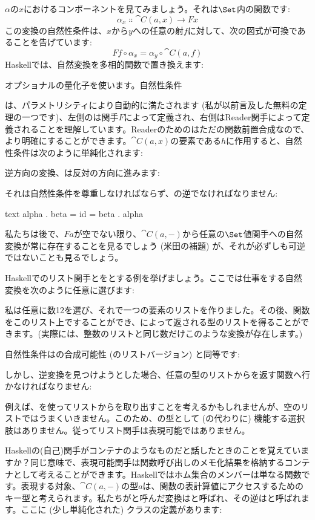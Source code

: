 $\alpha$の$x$におけるコンポーネントを見てみましょう。それは$\Set$内の関数です: 
\[\alpha_x \Colon \cat{C}(a, x) \to F x\]
この変換の自然性条件は、$x$から$y$への任意の射$f$に対して、次の図式が可換であることを告げています: 
\[F f \circ \alpha_x = \alpha_y \circ \cat{C}(a, f)\]
Haskellでは、自然変換を多相的関数で置き換えます: 

オプショナルの量化子を使います。自然性条件

は、パラメトリシティにより自動的に満たされます (私が以前言及した無料の定理の一つです)、左側のは関手$F$によって定義され、右側はReader関手によって定義されることを理解しています。Readerのためのはただの関数前置合成なので、より明確にすることができます。$\cat{C}(a, x)$の要素である$h$に作用すると、自然性条件は次のように単純化されます: 

逆方向の変換、は反対の方向に進みます: 

それは自然性条件を尊重しなければならず、の逆でなければなりません: 

\begin{snip}{text}
alpha . beta = id = beta . alpha
\end{snip}
私たちは後で、$F a$が空でない限り、$\cat{C}(a, -)$から任意の$\Set$値関手への自然変換が常に存在することを見るでしょう (米田の補題) が、それが必ずしも可逆ではないことも見るでしょう。

Haskellでのリスト関手とをとする例を挙げましょう。ここでは仕事をする自然変換を次のように任意に選びます: 

私は任意に数12を選び、それで一つの要素のリストを作りました。その後、関数をこのリスト上ですることができ、によって返される型のリストを得ることができます。(実際には、整数のリストと同じ数だけこのような変換が存在します。) 

自然性条件はの合成可能性 (のリストバージョン) と同等です: 

しかし、逆変換を見つけようとした場合、任意の型のリストからを返す関数へ行かなければなりません: 

例えば、を使ってリストからを取り出すことを考えるかもしれませんが、空のリストではうまくいきません。このため、の型として (の代わりに) 機能する選択肢はありません。従ってリスト関手は表現可能ではありません。

Haskellの(自己)関手がコンテナのようなものだと話したときのことを覚えていますか？同じ意味で、表現可能関手は関数呼び出しのメモ化結果を格納するコンテナとして考えることができます。Haskellではホム集合のメンバーは単なる関数です。表現する対象、$\cat{C}(a, -)$の型$a$は、関数の表計算値にアクセスするためのキー型と考えられます。私たちがと呼んだ変換はと呼ばれ、その逆はと呼ばれます。ここに (少し単純化された) クラスの定義があります: 

